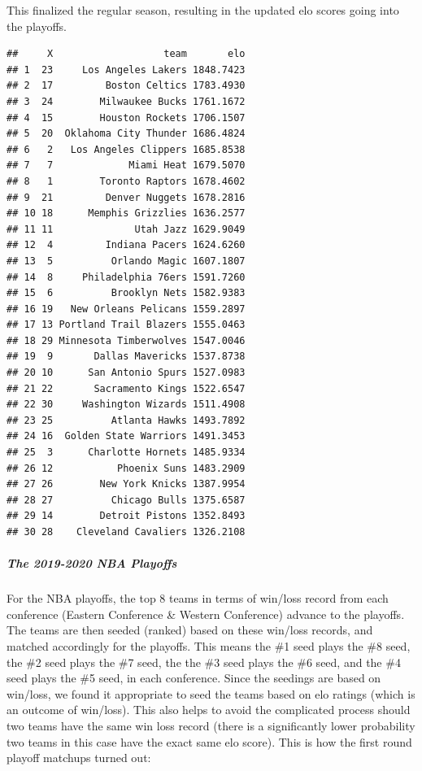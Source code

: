 \documentclass[]{article}
\let\oldsubparagraph\subparagraph
\renewcommand{\subparagraph}[1]{\oldsubparagraph{#1}\mbox{}}
\begin{document}
This finalized the regular season, resulting in the updated elo scores
going into the playoffs.

\begin{verbatim}
##     X                   team       elo
## 1  23     Los Angeles Lakers 1848.7423
## 2  17         Boston Celtics 1783.4930
## 3  24        Milwaukee Bucks 1761.1672
## 4  15        Houston Rockets 1706.1507
## 5  20  Oklahoma City Thunder 1686.4824
## 6   2   Los Angeles Clippers 1685.8538
## 7   7             Miami Heat 1679.5070
## 8   1        Toronto Raptors 1678.4602
## 9  21         Denver Nuggets 1678.2816
## 10 18      Memphis Grizzlies 1636.2577
## 11 11              Utah Jazz 1629.9049
## 12  4         Indiana Pacers 1624.6260
## 13  5          Orlando Magic 1607.1807
## 14  8     Philadelphia 76ers 1591.7260
## 15  6          Brooklyn Nets 1582.9383
## 16 19   New Orleans Pelicans 1559.2897
## 17 13 Portland Trail Blazers 1555.0463
## 18 29 Minnesota Timberwolves 1547.0046
## 19  9       Dallas Mavericks 1537.8738
## 20 10      San Antonio Spurs 1527.0983
## 21 22       Sacramento Kings 1522.6547
## 22 30     Washington Wizards 1511.4908
## 23 25          Atlanta Hawks 1493.7892
## 24 16  Golden State Warriors 1491.3453
## 25  3      Charlotte Hornets 1485.9334
## 26 12           Phoenix Suns 1483.2909
## 27 26        New York Knicks 1387.9954
## 28 27          Chicago Bulls 1375.6587
## 29 14        Detroit Pistons 1352.8493
## 30 28    Cleveland Cavaliers 1326.2108
\end{verbatim}

\hypertarget{the-2019-2020-nba-playoffs}{%
\subparagraph{The 2019-2020 NBA
Playoffs}\label{the-2019-2020-nba-playoffs}}

For the NBA playoffs, the top 8 teams in terms of win/loss record from
each conference (Eastern Conference \& Western Conference) advance to
the playoffs. The teams are then seeded (ranked) based on these win/loss
records, and matched accordingly for the playoffs. This means the \#1
seed plays the \#8 seed, the \#2 seed plays the \#7 seed, the the \#3
seed plays the \#6 seed, and the \#4 seed plays the \#5 seed, in each
conference. Since the seedings are based on win/loss, we found it
appropriate to seed the teams based on elo ratings (which is an outcome
of win/loss). This also helps to avoid the complicated process should
two teams have the same win loss record (there is a significantly lower
probability two teams in this case have the exact same elo score). This
is how the first round playoff matchups turned out:
\end{document}
